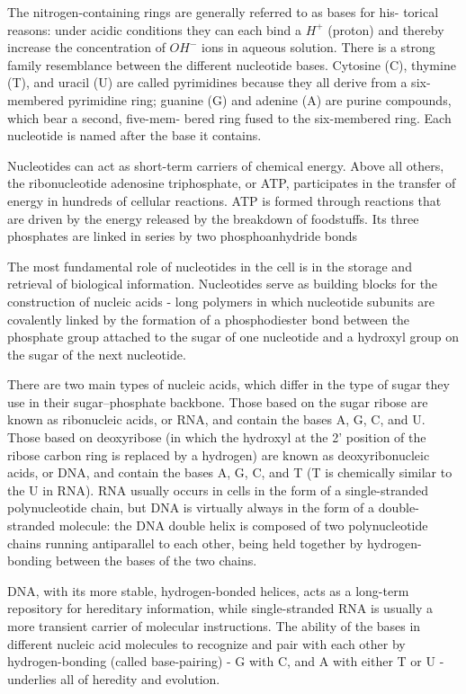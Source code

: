 The nitrogen-containing rings are generally referred to as bases for his-
torical reasons: under acidic conditions they can each bind a $H^{+}$ (proton)
and thereby increase the concentration of $OH^{-}$ ions in aqueous solution.
There is a strong family resemblance between the different nucleotide
bases. Cytosine (C), thymine (T), and uracil (U) are called pyrimidines
because they all derive from a six-membered pyrimidine ring; guanine (G)
and adenine (A) are purine compounds, which bear a second, five-mem-
bered ring fused to the six-membered ring. Each nucleotide is named
after the base it contains.

Nucleotides can act as short-term carriers of chemical energy. Above all
others, the ribonucleotide adenosine triphosphate, or ATP,
participates in the transfer of energy in hundreds of cellular reactions.
ATP is formed through reactions that are driven by the energy released by
the breakdown of foodstuffs. Its three phosphates are linked in series by
two phosphoanhydride bonds

The most fundamental role of nucleotides in the cell is in the storage and
retrieval of biological information. Nucleotides serve as building blocks
for the construction of nucleic acids - long polymers in which nucleotide
subunits are covalently linked by the formation of a phosphodiester bond
between the phosphate group attached to the sugar of one nucleotide
and a hydroxyl group on the sugar of the next nucleotide.

There are two main types of nucleic acids, which differ in the type of
sugar they use in their sugar–phosphate backbone. Those based on the
sugar ribose are known as ribonucleic acids, or RNA, and contain the
bases A, G, C, and U. Those based on deoxyribose (in which the hydroxyl
at the 2' position of the ribose carbon ring is replaced by a hydrogen) 
are known as deoxyribonucleic acids, or DNA, and contain the bases A, G, C, and T 
(T is chemically similar to the U in RNA). 
RNA usually occurs in cells in the form of a single-stranded polynucleotide chain, 
but DNA is virtually always in the form
of a double-stranded molecule: the DNA double helix is composed of
two polynucleotide chains running antiparallel to each other, being held
together by hydrogen-bonding between the bases of the two chains.

DNA, with its more stable, hydrogen-bonded
helices, acts as a long-term repository for hereditary information, while
single-stranded RNA is usually a more transient carrier of molecular
instructions. The ability of the bases in different nucleic acid molecules
to recognize and pair with each other by hydrogen-bonding (called base-pairing) 
- G with C, and A with either T or U - underlies all of heredity and
evolution.

